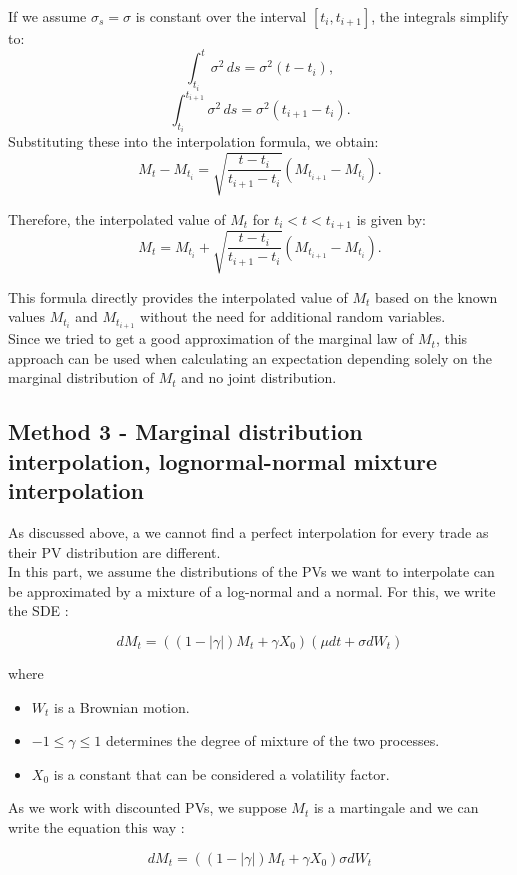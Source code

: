 \documentclass{article}
\begin{document}
If we assume \( \sigma_s = \sigma \) is constant over the interval \([t_i, t_{i+1}]\), the integrals simplify to:
\[
\int_{t_i}^{t} \sigma^2 \, ds = \sigma^2(t - t_i),
\]
\[
\int_{t_i}^{t_{i+1}} \sigma^2 \, ds = \sigma^2(t_{i+1} - t_i).
\]
Substituting these into the interpolation formula, we obtain:
\[
M_t - M_{t_i} = \sqrt{\frac{t - t_i}{t_{i+1} - t_i}} (M_{t_{i+1}} - M_{t_i}).
\]

Therefore, the interpolated value of \( M_t \) for \( t_i < t < t_{i+1} \) is given by:
\[
M_t = M_{t_i} + \sqrt{\frac{t - t_i}{t_{i+1} - t_i}} (M_{t_{i+1}} - M_{t_i}).
\]

This formula directly provides the interpolated value of \( M_t \) based on the known values \( M_{t_i} \) and \( M_{t_{i+1}} \) without the need for additional random variables.\\
Since we tried to get a good approximation of the marginal law of $M_t$, this approach can be used when calculating an expectation depending solely on the marginal distribution of $M_t$ and no joint distribution.

\subsection{Method 3 - Marginal distribution interpolation, lognormal-normal mixture interpolation}

As discussed above, a we cannot find a perfect interpolation for every trade as their PV distribution are different.\\
In this part, we assume the distributions of the PVs we want to interpolate can be approximated by a mixture of a log-normal and a normal. For this, we write the SDE :

$$dM_t = ((1 - |\gamma|)M_t + \gamma X_0) (\mu dt + \sigma dW_t)$$

where 

\begin{itemize}
    \item $W_t$ is a Brownian motion.
    \item $-1 \leq \gamma \leq 1$ determines the degree of mixture of the two processes.
    \item $X_0$ is a constant that can be considered a volatility factor.
\end{itemize}

As we work with discounted PVs, we suppose $M_t$ is a martingale and we can write the equation this way :

$$dM_t = ((1 - |\gamma|)M_t + \gamma X_0) \sigma dW_t$$
\end{document}
